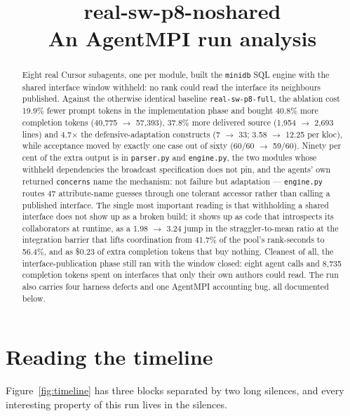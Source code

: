 \documentclass[11pt]{article}
\title{\textbf{real-sw-p8-noshared}\\[2pt]\large An AgentMPI run analysis}
\author{}
\date{}
\begin{document}
\maketitle

\begin{abstract}
Eight real Cursor subagents, one per module, built the \texttt{minidb} SQL engine with the
shared interface window withheld: no rank could read the interface its neighbours published.
Against the otherwise identical baseline \texttt{real-sw-p8-full}, the ablation cost 19.9\%
fewer prompt tokens in the implementation phase and bought 40.8\% more completion tokens
(40{,}775 $\rightarrow$ 57{,}393), 37.8\% more delivered source (1{,}954 $\rightarrow$ 2{,}693
lines) and 4.7$\times$ the defensive-adaptation constructs (7 $\rightarrow$ 33; 3.58
$\rightarrow$ 12.25 per kloc), while acceptance moved by exactly one case out of sixty
(60/60 $\rightarrow$ 59/60). Ninety per cent of the extra output is in \texttt{parser.py} and
\texttt{engine.py}, the two modules whose withheld dependencies the broadcast specification
does not pin, and the agents' own returned \texttt{concerns} name the mechanism: not failure
but adaptation --- \texttt{engine.py} routes 47 attribute-name guesses through one tolerant
accessor rather than calling a published interface. The single most important reading is that
withholding a shared interface does not show up as a broken build; it shows up as code that
introspects its collaborators at runtime, as a 1.98 $\rightarrow$ 3.24 jump in the
straggler-to-mean ratio at the integration barrier that lifts coordination from 41.7\% of the
pool's rank-seconds to 56.4\%, and as \$0.23 of extra completion tokens that buy nothing.
Cleanest of all, the interface-publication phase still ran with the window closed: eight agent
calls and 8{,}735 completion tokens spent on interfaces that only their own authors could read.
The run also carries four harness defects and one AgentMPI accounting bug, all documented below.
\end{abstract}



\section{Reading the timeline}

Figure~\ref{fig:timeline} has three blocks separated by two long silences, and every
interesting property of this run lives in the silences.
\end{document}
